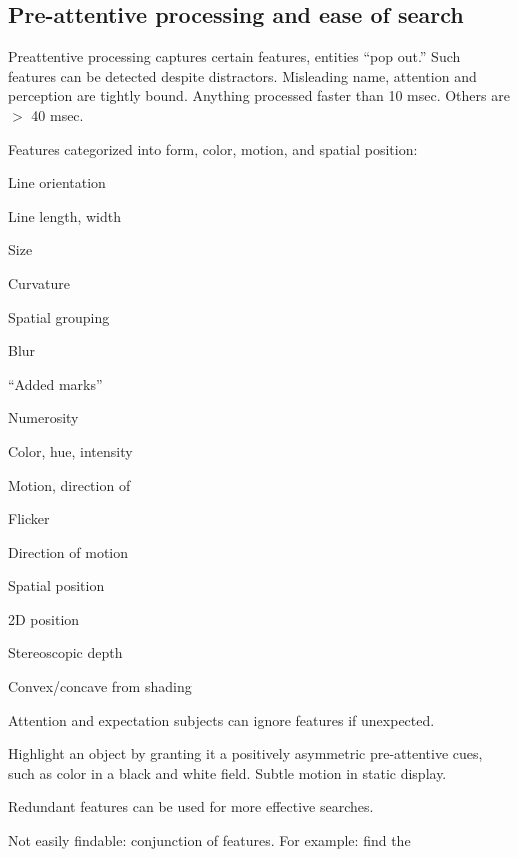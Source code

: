 \begin{mdframed}\begin{multicols}{2}
\subsection{Pre-attentive processing and ease of search}
\begin{compactdesc}
    \item[Preattentive processing] captures certain features, entities
        ``pop out.'' Such features can be detected despite distractors.
        Misleading name, attention and perception are tightly bound.
        Anything processed faster than 10 msec. Others are $>$ 40 msec.
    \item[Features] categorized into form, color, motion, and spatial
        position:
        \begin{compactenum}
        \item Line orientation
        \item Line length, width
        \item Size
        \item Curvature
        \item Spatial grouping
        \item Blur
        \item ``Added marks''
        \item Numerosity
        \item Color, hue, intensity
        \item Motion, direction of
        \item Flicker
        \item Direction of motion
        \item Spatial position
        \item 2D position
        \item Stereoscopic depth
        \item Convex/concave from shading
        \end{compactenum}
    \item[Attention and expectation] subjects can ignore features if unexpected.
    \item[Highlight] an object by granting it a positively asymmetric
        pre-attentive cues, such as color in a black and white field.
        Subtle motion in static display.
    \item[Redundant features] can be used for more effective searches.
    \item[Not easily findable:] conjunction of features. For example: find the

\end{compactdesc}
\end{multicols}
\end{mdframed}
